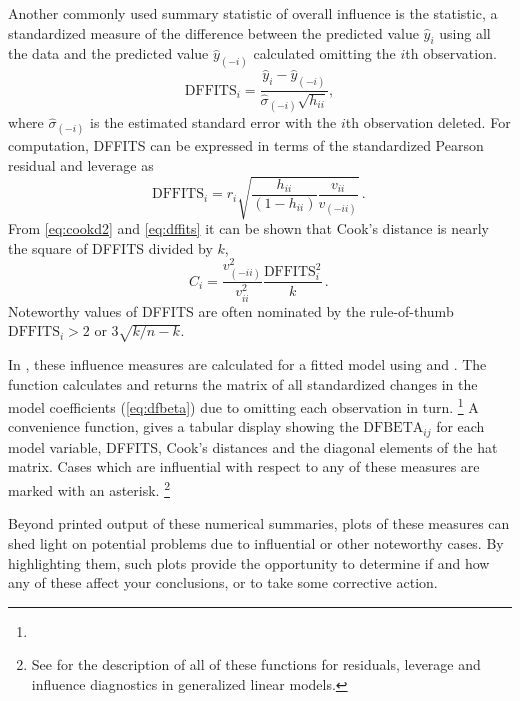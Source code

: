 \documentclass[11pt]{book}\usepackage[]{graphicx}\usepackage[]{color}
\begin{document}
Another commonly used summary statistic of overall influence is
the  statistic, a standardized measure of the difference
between the predicted value $\hat{y}_i$ using all the data
and the predicted value $\hat{y}_{(-i)}$ calculated omitting
the $i$th observation.
\begin{equation*}
\mbox{DFFITS}_i = \frac{\hat{y}_i - \hat{y}_{(-i)}} {\hat{\sigma}_{(-i)} \sqrt{h_{ii}}}
\comma
\end{equation*}
where $\hat{\sigma}_{(-i)}$ is the estimated standard error with the $i$th observation
deleted.  For computation, DFFITS can be expressed in terms of the standardized
Pearson residual and leverage as
\begin{equation}\label{eq:dffits}
\mbox{DFFITS}_i = r_i  \sqrt{ \frac{h_{ii}} {(1-h_{ii})} \frac{v_{ii}} {v_{(-ii)}} }
\period
\end{equation}
From \eqref{eq:cookd2} and \eqref{eq:dffits} it can be shown that Cook's distance is
nearly the square of DFFITS divided by $k$,
\begin{equation}\label{eq:cook-dffits}
C_i = \frac{v_{(-ii)}^2}{v_{ii}^2} \frac{\mbox{DFFITS}_i^2}{k}
\period
\end{equation}
Noteworthy values of DFFITS are often nominated by the rule-of-thumb
$\mbox{DFFITS}_i > 2 \mbox{ or } 3 \sqrt{k / n-k}$.

In \R, these influence measures are calculated for a fitted 
model using  and .  
The  function calculates and returns the matrix of 
all standardized changes in the model coefficients (\eqref{eq:dfbeta})
due to omitting each observation in turn.%
\footnote{
}
A convenience
function,  gives a tabular display showing
the $\mbox{DFBETA}_{ij}$ for each model variable, DFFITS, Cook's distances and the diagonal elements of the hat matrix. 
Cases which are influential with respect to any of these measures are marked with an asterisk.%
\footnote{
See  for the description of all of these functions for residuals,
leverage and influence diagnostics in generalized linear models.
}

Beyond printed output of these numerical summaries, plots of these measures can shed light
on potential problems due to influential or other noteworthy cases. By highlighting them,
such plots provide the opportunity to determine if and how any of these affect your 
conclusions, or to take some corrective action.
\end{document}
